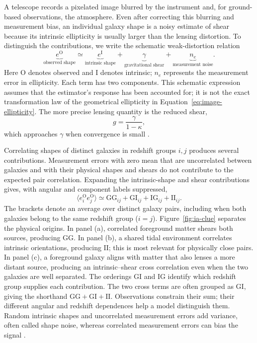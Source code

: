 A telescope records a pixelated image blurred by the instrument and, for
ground-based observations, the atmosphere. Even after correcting this
blurring and measurement bias, an individual galaxy shape is a noisy estimate
of shear because its intrinsic ellipticity is usually larger than the
lensing distortion. To distinguish the contributions, we write the
schematic weak-distortion relation
\begin{equation}
 \underbrace{e^{\mathrm{O}}}_{\text{observed shape}}
 \simeq
 \underbrace{e^{\mathrm{I}}}_{\text{intrinsic shape}}
 +\underbrace{\gamma}_{\text{gravitational shear}}
 +\underbrace{n_e}_{\text{measurement noise}}.
 \label{eq:observed-ellipticity}
\end{equation}
Here O denotes observed and I denotes intrinsic; $n_e$ represents the
measurement error in ellipticity. Each term has two components. This
schematic expression assumes that the estimator's response has been
accounted for; it is not the exact transformation law of the geometrical
ellipticity in Equation~\eqref{eq:image-ellipticity}. The more precise
lensing quantity is the reduced shear,
\begin{equation}
  g=\frac{\gamma}{1-\kappa},
  \label{eq:reduced-shear}
\end{equation}
which approaches $\gamma$ when convergence is small
\citep{2001PhR...340..291B}.

Correlating shapes of distinct galaxies in redshift groups $i,j$ produces
several contributions. Measurement errors with zero mean that are
uncorrelated between galaxies and with their physical shapes and shears
do not contribute to the expected pair correlation. Expanding the
intrinsic-shape and shear contributions gives, with angular and component
labels suppressed,
\begin{equation}
  \big\langle e_i^{\mathrm{O}}e_j^{\mathrm{O}}\big\rangle
  \simeq \mathrm{GG}_{ij}+\mathrm{GI}_{ij}
       +\mathrm{IG}_{ij}+\mathrm{II}_{ij}.
  \label{eq:shape-correlation-components}
\end{equation}
The brackets denote an average over distinct galaxy pairs, including when
both galaxies belong to the same redshift group ($i=j$).
Figure~\ref{fig:ia-clue} separates the physical origins. In panel (a),
correlated foreground matter shears both sources, producing $\mathrm{GG}$.
In panel (b), a shared tidal environment correlates intrinsic orientations,
producing $\mathrm{II}$; this is most relevant for physically close pairs.
In panel (c), a foreground galaxy aligns with matter that also lenses a
more distant source, producing an intrinsic--shear cross correlation even
when the two galaxies are well separated. The orderings $\mathrm{GI}$ and
$\mathrm{IG}$ identify which redshift group supplies each contribution.
The two cross terms are often grouped as $\mathrm{GI}$, giving the shorthand
$\mathrm{GG}+\mathrm{GI}+\mathrm{II}$. Observations constrain their sum;
their different angular and redshift dependences help a model distinguish
them. Random intrinsic shapes and uncorrelated measurement errors add
variance, often called shape noise, whereas correlated measurement errors
can bias the signal \citep{2025A&ARv..33....5C}.

